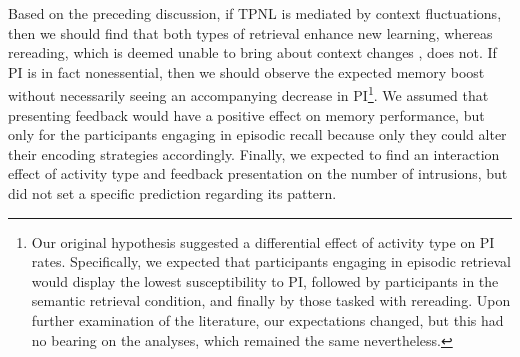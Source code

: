 \documentclass[../main.tex]{subfiles}
\begin{document}
Based on the preceding discussion, if TPNL is mediated by context 
fluctuations, then we should find that both types of retrieval enhance new 
learning, whereas rereading, which is deemed unable to bring about context 
changes \citep{chanRetrievalPotentiatesNew2018}, does not. If PI is in fact 
nonessential, then we should observe the expected memory boost without 
necessarily seeing an accompanying decrease in PI\footnote{Our original 
hypothesis suggested a differential effect of activity type on PI rates. 
Specifically, we expected that participants engaging in episodic retrieval 
would display the lowest susceptibility to PI, followed by participants in 
the semantic retrieval condition, and finally by those tasked with 
rereading. Upon further examination of the literature, our expectations 
changed, but this had no bearing on the analyses, which remained the same 
nevertheless.}. We assumed that presenting feedback would have a positive 
effect on memory performance, but only for the participants engaging in 
episodic recall because only they could alter their encoding strategies 
accordingly. Finally, we expected to find an interaction effect of activity 
type and feedback presentation on the number of intrusions, but did not set 
a specific prediction regarding its pattern.


{
	\biblio
}
\end{document}
